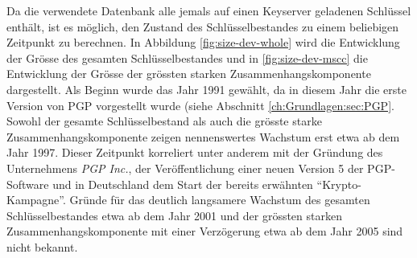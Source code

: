 Da die verwendete Datenbank alle jemals auf einen Keyserver geladenen
Schl\"ussel enth\"alt, ist es m\"oglich, den Zustand des
Schl\"usselbestandes zu einem beliebigen Zeitpunkt zu berechnen. In
Abbildung \ref{fig:size-dev-whole} wird die Entwicklung der Gr\"osse
des gesamten Schl\"usselbestandes und in \ref{fig:size-dev-mscc} die
Entwicklung der Gr\"osse der gr\"ossten starken
Zusammenhangskomponente dargestellt. Als Beginn wurde das Jahr 1991
gew\"ahlt, da in diesem Jahr die erste Version von PGP vorgestellt
wurde (siehe Abschnitt \ref{ch:Grundlagen:sec:PGP}. Sowohl der gesamte Schl\"usselbestand als auch
die gr\"osste starke Zusammenhangskomponente zeigen nennenswertes
Wachstum erst etwa ab dem Jahr 1997. Dieser Zeitpunkt korreliert unter
anderem mit der Gr\"undung des Unternehmens \emph{PGP Inc.}, der
Ver\"offentlichung einer neuen Version 5 der PGP-Software und in
Deutschland dem Start der bereits erw\"ahnten
``Krypto-Kampagne''. Gr\"unde f\"ur das deutlich langsamere Wachstum
des gesamten Schl\"usselbestandes etwa ab dem Jahr 2001 und der
gr\"ossten starken Zusammenhangskomponente mit einer Verz\"ogerung
etwa ab dem Jahr 2005 sind nicht bekannt.

